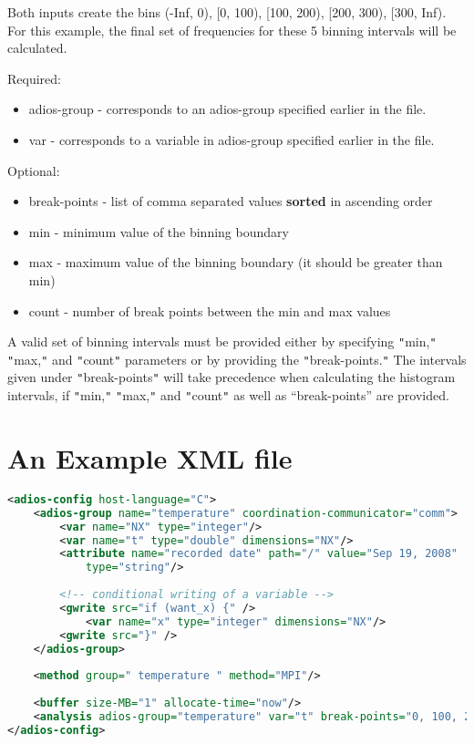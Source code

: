 Both inputs create the bins (-Inf, 0), [0, 100), [100, 200), [200, 300), [300, 
Inf). For this example, the final set of frequencies for these 5 binning intervals 
will be calculated.

Required:
\begin{itemize}
\item adios-group - corresponds to an adios-group specified earlier in the file.
\item var - corresponds to a variable in adios-group specified earlier in the file.
\end{itemize}

Optional:
\begin{itemize}
\item break-points - list of comma separated values \textbf{sorted} in ascending order
\item min  - minimum value of the binning boundary
\item max - maximum value of the binning boundary 
(it should be greater than min)
\item count - number of break points between the min and max values 
\end{itemize}

A valid set of binning intervals must be provided either by specifying \texttt{"}min,\texttt{"} 
\texttt{"}max,\texttt{"} and \texttt{"}count\texttt{"} parameters or by providing 
the \texttt{"}break-points.\texttt{"} The intervals given under \texttt{"}break-points\texttt{"} 
will take precedence when calculating the histogram intervals, if \texttt{"}min,\texttt{"} 
\texttt{"}max,\texttt{"} and \texttt{"}count\texttt{"} as well as ``break-points'' 
are provided.

\section{An Example XML file}

\begin{lstlisting}[language=XML, caption={Example XML file.}, label=list-example-xml]
<adios-config host-language="C">
	<adios-group name="temperature" coordination-communicator="comm">
		<var name="NX" type="integer"/>
		<var name="t" type="double" dimensions="NX"/>
		<attribute name="recorded date" path="/" value="Sep 19, 2008" 
			type="string"/> 
		
		<!-- conditional writing of a variable -->
		<gwrite src="if (want_x) {" />
			<var name="x" type="integer" dimensions="NX"/>
		<gwrite src="}" />
	</adios-group>
	
	<method group=" temperature " method="MPI"/>
	
	<buffer size-MB="1" allocate-time="now"/>
	<analysis adios-group="temperature" var="t" break-points="0, 100, 200, 300"/> 
</adios-config>
\end{lstlisting}

